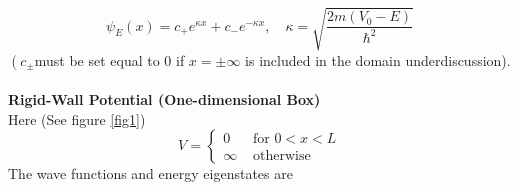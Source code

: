 \documentclass{article}
\begin{document}
\begin{equation}
\psi_{E}(x)=c_{+} e^{\kappa x}+c_{-} e^{-\kappa x}, \quad \kappa=\sqrt{\frac{2 m\left(V_{0}-E\right)}{\hbar^{2}}}
\end{equation}
$\left(c_{\pm}\right.$must be set equal to 0 if $x=\pm \infty$ is included in the domain underdiscussion).
\\
\\
\textbf{Rigid-Wall Potential (One-dimensional Box)}
\\
Here (See figure \ref{fig1})
\begin{equation}
V= \begin{cases}0 & \text { for } 0<x<L \\ \infty & \text { otherwise }\end{cases}
\end{equation}
The wave functions and energy eigenstates are
\end{document}
